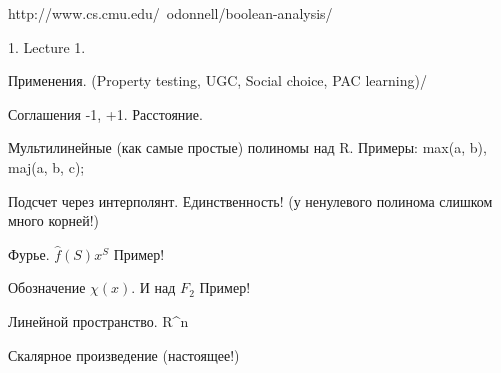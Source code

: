 http://www.cs.cmu.edu/~odonnell/boolean-analysis/


1. Lecture 1.

Применения. (Property testing, UGC, Social choice, PAC learning)/


Соглашения {-1, +1}. Расстояние.

Мультилинейные (как самые простые) полиномы над R. Примеры: max(a, b), maj(a, b, c);

Подсчет через интерполянт. Единственность! (у ненулевого полинома слишком много корней!)


Фурье. $\hat{f}(S) x^S$
Пример!

Обозначение $\chi(x)$. И над $F_2$
Пример!


Линейной пространство. R^{n}

Скалярное произведение (настоящее!)